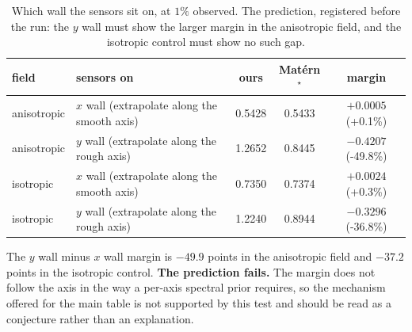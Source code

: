 \begin{table}[h]
  \centering
  \caption{Which wall the sensors sit on, at $1\%$ observed.  The prediction, registered before the run: the $y$ wall must show the larger margin in the anisotropic field, and the isotropic control must show no such gap.}
  \label{tab:anisotropy}
  \small
  \begin{tabular}{llccc}
    \toprule
    field & sensors on & ours & Mat\'ern$^\star$ & margin \\
    \midrule
    anisotropic & $x$ wall (extrapolate along the smooth axis) & 0.5428 & 0.5433 & $+0.0005$ (+0.1\%) \\
    anisotropic & $y$ wall (extrapolate along the rough axis) & 1.2652 & 0.8445 & $-0.4207$ (-49.8\%) \\
    isotropic & $x$ wall (extrapolate along the smooth axis) & 0.7350 & 0.7374 & $+0.0024$ (+0.3\%) \\
    isotropic & $y$ wall (extrapolate along the rough axis) & 1.2240 & 0.8944 & $-0.3296$ (-36.8\%) \\
    \bottomrule
  \end{tabular}
\end{table}

The $y$ wall minus $x$ wall margin is $-49.9$ points in the anisotropic field and $-37.2$ points in the isotropic control. \textbf{The prediction fails.}  The margin does not follow the axis in the way a per-axis spectral prior requires, so the mechanism offered for the main table is not supported by this test and should be read as a conjecture rather than an explanation.
